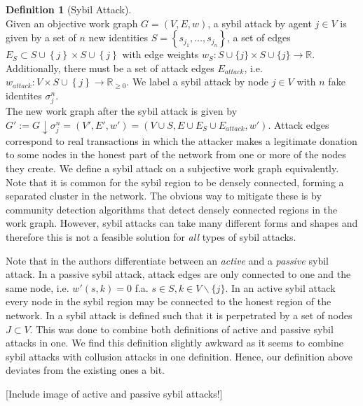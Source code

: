 \documentclass[11pt,a4paper]{article}
\theoremstyle{definition}
\newtheorem{definition}{Definition}[section]
\theoremstyle{theorem}
\theoremstyle{proposition}
\theoremstyle{corollary}
\theoremstyle{lemma}
\theoremstyle{example}
\theoremstyle{remark}
\begin{document}
\begin{definition}[Sybil Attack]\ \\
Given an objective work graph $G=(V,E,w)$, a sybil attack by agent $j\in{}V$ is given by a set of $n$ new identities $S=\left\lbrace{}s_{j_1},\ldots{},s_{j_n}\right\rbrace$, a set of edges $E_S\subset{}S\cup\left\lbrace{}j\right\rbrace\times{}S\cup\left\lbrace{}j\right\rbrace$ with edge weights $w_S:S\cup{}\{j\} \times S\cup{}\{j\}\rightarrow{}\mathbb{R}$. Additionally, there must be a set of attack edges $E_{attack}$, i.e. $w_{attack}:V\times{}S\cup\left\lbrace{}j\right\rbrace\rightarrow\mathbb{R}_{\geq{}0}$. We label a sybil attack by node $j\in{}V$ with $n$ fake identites $\sigma^n_j$. \vspace{1em}\\

\noindent{}The new work graph after the sybil attack is given by $G':=G\downarrow\sigma^n_j=(V',E',w')=(V\cup{}S,E\cup{}E_S\cup{}E_{attack},w')$. Attack edges correspond to real transactions in which the attacker makes a legitimate donation to some nodes in the honest part of the network from one or more of the nodes they create. We define a sybil attack on a subjective work graph equivalently. Note that it is common for the sybil region to be densely connected, forming a separated cluster in the network. The obvious way to mitigate these is by community detection algorithms that detect densely connected regions in the work graph. However, sybil attacks can take many different forms and shapes and therefore this is not a feasible solution for {\it all} types of sybil attacks. \vspace{1em}\\
\end{definition}

\noindent{}Note that in \cite{On the Sybil-Proofness of Accounting Mechanisms} the authors differentiate between an {\it active} and a {\it passive} sybil attack. In a passive sybil attack, attack edges are only connected to one and the same node, i.e. $w'(s,k)=0$ f.a. $s\in{}S,k\in{}V\backslash\lbrace{}j\rbrace$. In an active sybil attack every node in the sybil region may be connected to the honest region of the network. In \cite{Sybil-resistant Trust Mechanisms in Distributed Systems} a sybil attack is defined such that it is perpetrated by a set of nodes $J\subset{}V$. This was done to combine both definitions of active and passive sybil attacks in one. We find this definition slightly awkward as it seems to combine sybil attacks with collusion attacks in one definition. Hence, our definition above deviates from the existing ones a bit.\vspace{1em}\\ 
\begin{center}[Include image of active and passive sybil attacks!] \vspace{1em}\\ \end{center}
\end{document}
